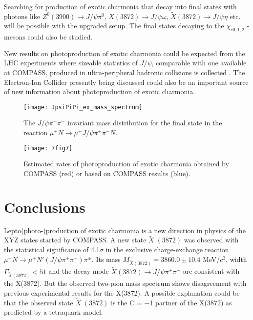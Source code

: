 \documentclass[a4paper]{jpconf}
\begin{document}
Searching for production of exotic charmonia that decay into final states with photons like $Z^0(3900)\to J/\psi\pi^0$, $X(3872)\to J/\psi \omega$, $\widetilde{X}(3872)\to J/\psi \eta$ etc. will be possible with the upgraded setup. The final states decaying to the $\chi_{c0,1,2}$ -mesons could also be studied.

New results on photoproduction of exotic charmonia could be expected from the LHC experiments where sizeable statistics of $J/\psi$, comparable with one available at COMPASS, produced in ultra-peripheral hadronic collisions is collected \cite{Aaij:2014iea,Abelev:2012ba,Kryshen:2017jfz,Khachatryan:2016qhq}. 
The Electron-Ion Collider  \cite{Accardi:2012qut} presently being discussed could also be an important source of new information about photoproduction of exotic charmonia.

 \begin{figure}
 \begin{minipage}{16pc}
   \texttt{[image: JpsiPiPi\_ex\_mass\_spectrum]}  
     \caption{\label{fig:x3872_neutral}
The $J/\psi\pi^+\pi^-$ invariant mass distribution for the final state in the reaction $\mu^+ N \to \mu^+ J/\psi\pi^+\pi^-N$. }
\end{minipage}\hspace{2pc}%
\begin{minipage}{20pc}
   \texttt{[image: 7fig7]}  
     \caption{\label{fig:total} Estimated rates of photoproduction of exotic charmonia obtained by COMPASS (red) or based on COMPASS results (blue).}
\end{minipage}
 \end{figure}

\section{Conclusions}
Lepto(photo-)production of exotic charmonia is a new direction in physics of the XYZ states started by COMPASS. 
A new state $\widetilde{X}􏰐(3872)$ was observed  with the statistical significance of 4.1$\sigma$ in the exclusive charge-exchange reaction $\mu^+ N \rightarrow \mu^+ N' (J/\psi \pi^+\pi^-)\pi^{\pm}$. Its mass 
$M_{\widetilde{X}(3872)}=3860.0\pm10.4$ MeV/$c^2$, width $\Gamma_{\widetilde{X}(3872)}< 51$ and the decay mode $\widetilde{X}(3872)\to J/\psi\pi^+\pi^-$ are consistent with the X(3872). But the observed two-pion mass spectrum shows disagreement with previous experimental results for the X(3872). A possible explanation could be that the observed state $\widetilde{X}􏰐(3872)$ is the C = −1 partner of the X(3872) as predicted by a tetraquark model.
\end{document}
